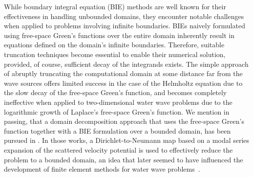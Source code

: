 \documentclass[review,hidelinks,onefignum,onetabnum]{siamart220329}
\begin{document}

While boundary integral equation (BIE) methods are well known for their effectiveness in handling unbounded domains, they encounter notable challenges when applied to problems involving infinite boundaries. BIEs naively formulated using free-space Green's functions over the entire domain inherently result in equations defined on the domain's infinite boundaries. Therefore, suitable truncation techniques become essential to enable their numerical solution, provided, of course,  sufficient decay of the integrands exists. The simple approach of abruptly truncating the computational domain at some distance far from the wave sources offers limited success in the case of the Helmholtz equation due to the slow decay of the free-space Green's function, and becomes completely ineffective when applied to two-dimensional water wave problems due to the logarithmic growth of Laplace's free-space Green's function. We mention in passing, that  a domain decomposition approach that uses the free-space Green's function together with a BIE formulation over a bounded domain, has been pursued in \cite{mei1978numerical,yeung1982numerical}. In those works, a Dirichlet-to-Neumann map based on a modal series expansion of the scattered velocity potential is used to effectively reduce the problem to a bounded domain, an idea that later seemed to have influenced the development of finite element methods for water wave problems~\cite{lenoir1988localized}.
\end{document}
